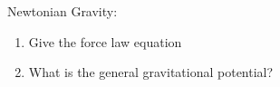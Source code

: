 

\vspace*{\fill}
\centering

Newtonian Gravity:
\begin{enumerate}
    \item Give the force law equation
    \item What is the general gravitational potential?
\end{enumerate}

\centering
\vspace*{\fill}


